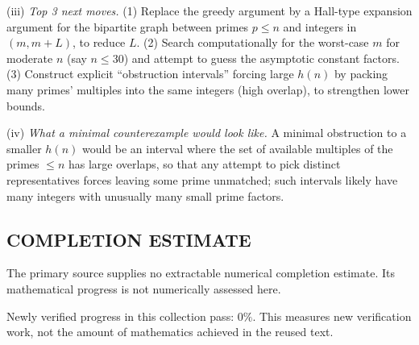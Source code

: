 (iii) \emph{Top 3 next moves.}
(1) Replace the greedy argument by a Hall-type expansion argument for the bipartite graph between primes $p\le n$ and integers in $(m,m+L)$, to reduce $L$.
(2) Search computationally for the worst-case $m$ for moderate $n$ (say $n\le 30$) and attempt to guess the asymptotic constant factors.
(3) Construct explicit ``obstruction intervals'' forcing large $h(n)$ by packing many primes' multiples into the same integers (high overlap), to strengthen lower bounds.

(iv) \emph{What a minimal counterexample would look like.}
A minimal obstruction to a smaller $h(n)$ would be an interval where the set of available multiples of the primes $\le n$ has large overlaps, so that any attempt to pick distinct representatives forces leaving some prime unmatched; such intervals likely have many integers with unusually many small prime factors.




\subsection*{COMPLETION ESTIMATE}
The primary source supplies no extractable numerical completion estimate. Its mathematical progress is not numerically assessed here.

Newly verified progress in this collection pass: $0\%$. This measures new verification work, not the amount of mathematics achieved in the reused text.
